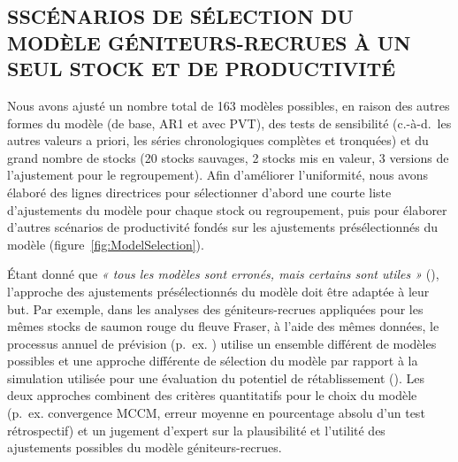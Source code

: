 \documentclass[french,11pt]{book}
\begin{document}
\subsection{SSCÉNARIOS DE SÉLECTION DU MODÈLE GÉNITEURS-RECRUES À UN SEUL STOCK ET DE PRODUCTIVITÉ}\label{ModelSelection}

Nous avons ajusté un nombre total de 163 modèles possibles, en raison des autres formes du modèle (de base, AR1 et avec PVT), des tests de sensibilité (c.-à-d.~les autres valeurs a priori, les séries chronologiques complètes et tronquées) et du grand nombre de stocks (20 stocks sauvages, 2 stocks mis en valeur, 3 versions de l'ajustement pour le regroupement). Afin d'améliorer l'uniformité, nous avons élaboré des lignes directrices pour sélectionner d'abord une courte liste d'ajustements du modèle pour chaque stock ou regroupement, puis pour élaborer d'autres scénarios de productivité fondés sur les ajustements présélectionnés du modèle (figure~\ref{fig:ModelSelection}).

Étant donné que \emph{« tous les modèles sont erronés, mais certains sont utiles »} (), l'approche des ajustements présélectionnés du modèle doit être adaptée à leur but. Par exemple, dans les analyses des géniteurs-recrues appliquées pour les mêmes stocks de saumon rouge du fleuve Fraser, à l'aide des mêmes données, le processus annuel de prévision (p.~ex. ) utilise un ensemble différent de modèles possibles et une approche différente de sélection du modèle par rapport à la simulation utilisée pour une évaluation du potentiel de rétablissement (). Les deux approches combinent des critères quantitatifs pour le choix du modèle (p.~ex. convergence MCCM, erreur moyenne en pourcentage absolu d'un test rétrospectif) et un jugement d'expert sur la plausibilité et l'utilité des ajustements possibles du modèle géniteurs-recrues.
\end{document}
